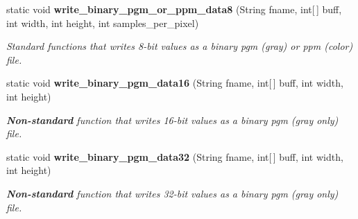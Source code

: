 \begin{CompactItemize}
static void {\bf write\_\-binary\_\-pgm\_\-or\_\-ppm\_\-data8} (String fname, int[$\,$] buff, int width, int height, int samples\_\-per\_\-pixel)
\begin{CompactList}\small\item\em Standard functions that writes 8-bit values as a binary pgm (gray) or ppm (color) file. \item\end{CompactList}\item 
static void {\bf write\_\-binary\_\-pgm\_\-data16} (String fname, int[$\,$] buff, int width, int height)
\begin{CompactList}\small\item\em {\bf Non-standard} function that writes 16-bit values as a binary pgm (gray only) file. \item\end{CompactList}\item 
static void {\bf write\_\-binary\_\-pgm\_\-data32} (String fname, int[$\,$] buff, int width, int height)
\begin{CompactList}\small\item\em {\bf Non-standard} function that writes 32-bit values as a binary pgm (gray only) file. \item\end{CompactList}\end{CompactItemize}
